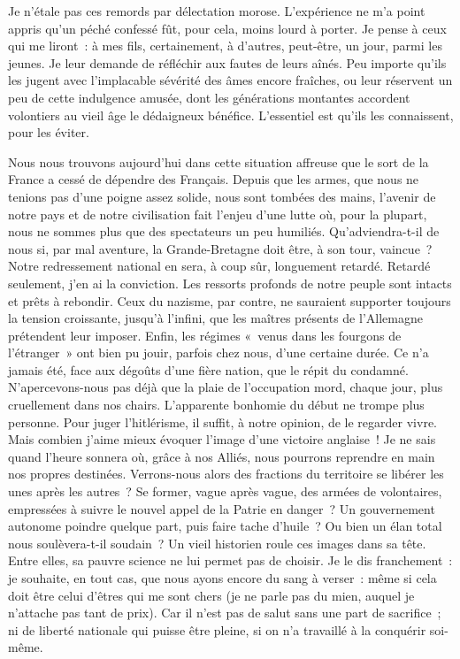 \documentclass[french,twoside]{book} %
\begin{document}
Je n’étale pas ces remords par délectation morose. L’expérience ne m’a point appris qu’un péché confessé fût, pour cela, moins lourd à porter. Je pense à ceux qui me liront : à mes fils, certainement, à d’autres,   peut-être, un jour, parmi les jeunes. Je leur demande de réfléchir aux fautes de leurs aînés. Peu importe qu’ils les jugent avec l’implacable sévérité des âmes encore fraîches, ou leur réservent un peu de cette indulgence amusée, dont les générations montantes accordent volontiers au vieil âge le dédaigneux bénéfice. L’essentiel est qu’ils les connaissent, pour les éviter.\par
Nous nous trouvons aujourd’hui dans cette situation affreuse que le sort de la France a cessé de dépendre des Français. Depuis que les armes, que nous ne tenions pas d’une poigne assez solide, nous sont tombées des mains, l’avenir de notre pays et de notre civilisation fait l’enjeu d’une lutte où, pour la plupart, nous ne sommes plus que des spectateurs un peu humiliés. Qu’adviendra-t-il de nous si, par mal aventure, la Grande-Bretagne doit être, à son tour, vaincue ? Notre redressement national en sera, à coup sûr, longuement retardé. Retardé seulement, j’en ai la conviction. Les ressorts profonds de notre peuple sont intacts et prêts à rebondir. Ceux du nazisme, par contre, ne sauraient supporter toujours la tension croissante, jusqu’à l’infini, que les maîtres présents de l’Allemagne prétendent leur imposer. Enfin, les régimes « venus dans les fourgons de l’étranger » ont bien pu jouir, parfois chez nous, d’une certaine durée. Ce n’a jamais été, face aux dégoûts d’une fière nation, que le répit du condamné. N’apercevons-nous pas déjà que la plaie de l’occupation mord, chaque jour, plus cruellement dans nos chairs. L’apparente bonhomie du début ne trompe plus personne. Pour juger l’hitlérisme, il suffit, à notre opinion, de le regarder vivre. Mais combien j’aime mieux évoquer l’image d’une victoire anglaise ! Je ne sais quand l’heure sonnera où, grâce à nos Alliés, nous pourrons reprendre en main nos propres destinées. Verrons-nous alors des fractions du territoire se libérer les unes après les autres ? Se former, vague après vague,   des armées de volontaires, empressées à suivre le nouvel appel de la Patrie en danger ? Un gouvernement autonome poindre quelque part, puis faire tache d’huile ? Ou bien un élan total nous soulèvera-t-il soudain ? Un vieil historien roule ces images dans sa tête. Entre elles, sa pauvre science ne lui permet pas de choisir. Je le dis franchement : je souhaite, en tout cas, que nous ayons encore du sang à verser : même si cela doit être celui d’êtres qui me sont chers (je ne parle pas du mien, auquel je n’attache pas tant de prix). Car il n’est pas de salut sans une part de sacrifice ; ni de liberté nationale qui puisse être pleine, si on n’a travaillé à la conquérir soi-même.\par
\end{document}
